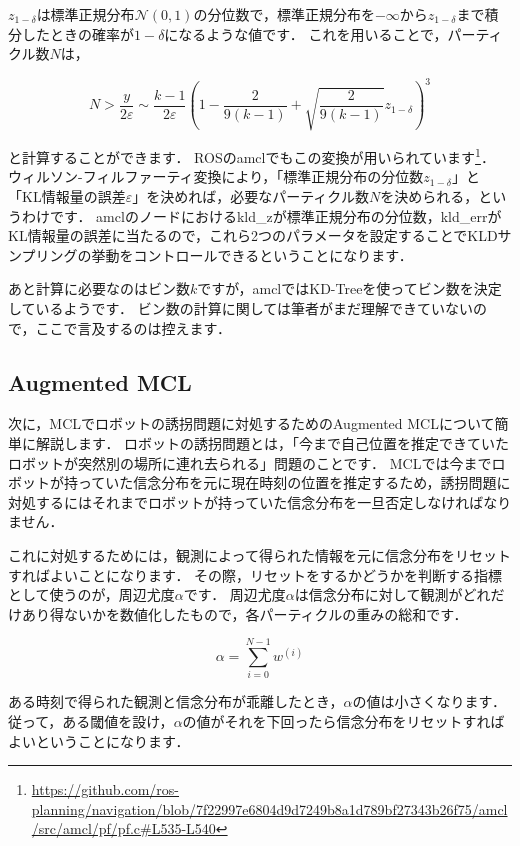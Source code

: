 \documentclass[{../../master}]{subfiles}
\begin{document}
$z_{1-\delta}$は標準正規分布$\mathcal{N}(0, 1)$の分位数で，標準正規分布を$-\infty$から$z_{1-\delta}$まで積分したときの確率が$1-\delta$になるような値です．
これを用いることで，パーティクル数$N$は，

\begin{equation}
  N > \frac{y}{2\varepsilon} \sim \frac{k-1}{2\varepsilon} \left( 1 - \frac{2}{9(k-1)} + \sqrt{\frac{2}{9(k-1)}}z_{1-\delta} \right)^{3}
\end{equation}

\noindent
と計算することができます．
ROSの\textsf{amcl}でもこの変換が用いられています\footnote{\url{https://github.com/ros-planning/navigation/blob/7f22997e6804d9d7249b8a1d789bf27343b26f75/amcl/src/amcl/pf/pf.c\#L535-L540}}．
ウィルソン-フィルファーティ変換により，「標準正規分布の分位数$z_{1-\delta}$」と「KL情報量の誤差$\varepsilon$」を決めれば，必要なパーティクル数$N$を決められる，というわけです．
\textsf{amcl}のノードにおける\textsf{kld\_z}が標準正規分布の分位数，\textsf{kld\_err}がKL情報量の誤差に当たるので，これら2つのパラメータを設定することでKLDサンプリングの挙動をコントロールできるということになります．

あと計算に必要なのはビン数$k$ですが，\textsf{amcl}ではKD-Treeを使ってビン数を決定しているようです．
ビン数の計算に関しては筆者がまだ理解できていないので，ここで言及するのは控えます．

\subsection{Augmented MCL}

次に，MCLでロボットの誘拐問題に対処するためのAugmented MCLについて簡単に解説します．
ロボットの誘拐問題とは，「今まで自己位置を推定できていたロボットが突然別の場所に連れ去られる」問題のことです．
MCLでは今までロボットが持っていた信念分布を元に現在時刻の位置を推定するため，誘拐問題に対処するにはそれまでロボットが持っていた信念分布を一旦否定しなければなりません．

これに対処するためには，観測によって得られた情報を元に信念分布をリセットすればよいことになります．
その際，リセットをするかどうかを判断する指標として使うのが，周辺尤度$\alpha$です．
周辺尤度$\alpha$は信念分布に対して観測がどれだけあり得ないかを数値化したもので，各パーティクルの重みの総和です．

\begin{equation}
  \alpha = \sum_{i=0}^{N-1} w^{(i)}
\end{equation}

ある時刻で得られた観測と信念分布が乖離したとき，$\alpha$の値は小さくなります．
従って，ある閾値を設け，$\alpha$の値がそれを下回ったら信念分布をリセットすればよいということになります．
\end{document}
